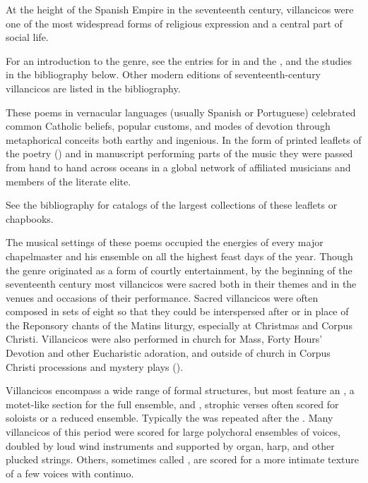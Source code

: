 
At the height of the Spanish Empire in the seventeenth century,
villancicos were one of the most widespread forms of religious expression and a central part of social life.%
  \begin{Footnote}
  For an introduction to the genre, see the entries for  in  and the , and the studies in the bibliography below.
  Other modern editions of seventeenth-century villancicos are listed in the bibliography.
  \end{Footnote}
These poems in vernacular languages (usually Spanish or Portuguese) celebrated common Catholic beliefs, popular customs, and modes of devotion through metaphorical conceits both earthy and ingenious.
In the form of printed leaflets of the poetry () and in manuscript performing parts of the music they were passed from hand to hand across oceans in a global network of affiliated musicians and members of the literate elite.%
  \begin{Footnote}
  See the bibliography for catalogs of the largest collections of these leaflets or chapbooks.
  \end{Footnote}

The musical settings of these poems occupied the energies of every major chapelmaster and his ensemble on all the highest feast days of the year.
Though the genre originated as a form of courtly entertainment, by the beginning of the seventeenth century most villancicos were sacred both in their themes and in the venues and occasions of their performance.
Sacred villancicos were often composed in sets of eight so that they could be interspersed after or in place of the Reponsory chants of the Matins liturgy, especially at Christmas and Corpus Christi.
Villancicos were also performed in church for Mass, Forty Hours' Devotion and other Eucharistic adoration, and outside of church in Corpus Christi processions and mystery plays ().

Villancicos encompass a wide range of formal structures, but most feature an , a motet-like section for the full ensemble, and , strophic verses often scored for soloists or a reduced ensemble.
Typically the  was repeated after the .
Many villancicos of this period were scored for large polychoral ensembles of voices, doubled by loud wind instruments and supported by organ, harp, and other plucked strings.
Others, sometimes called , are scored for a more intimate texture of a few voices with continuo.

